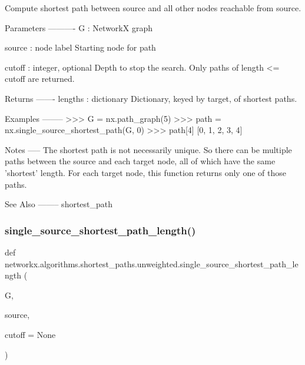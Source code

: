 \begin{DoxyVerb}Compute shortest path between source
and all other nodes reachable from source.

Parameters
----------
G : NetworkX graph

source : node label
   Starting node for path

cutoff : integer, optional
    Depth to stop the search. Only paths of length <= cutoff are returned.

Returns
-------
lengths : dictionary
    Dictionary, keyed by target, of shortest paths.

Examples
--------
>>> G = nx.path_graph(5)
>>> path = nx.single_source_shortest_path(G, 0)
>>> path[4]
[0, 1, 2, 3, 4]

Notes
-----
The shortest path is not necessarily unique. So there can be multiple
paths between the source and each target node, all of which have the
same 'shortest' length. For each target node, this function returns
only one of those paths.

See Also
--------
shortest_path
\end{DoxyVerb}
 \mbox{\label{namespacenetworkx_1_1algorithms_1_1shortest__paths_1_1unweighted_ab8850fb3b6673b6b89af23eab6c72b6f}} 
\subsubsection{\texorpdfstring{single\+\_\+source\+\_\+shortest\+\_\+path\+\_\+length()}{single\_source\_shortest\_path\_length()}}
{\footnotesize\ttfamily def networkx.\+algorithms.\+shortest\+\_\+paths.\+unweighted.\+single\+\_\+source\+\_\+shortest\+\_\+path\+\_\+length (\begin{DoxyParamCaption}\item[{}]{G,  }\item[{}]{source,  }\item[{}]{cutoff = {\ttfamily None} }\end{DoxyParamCaption})}

